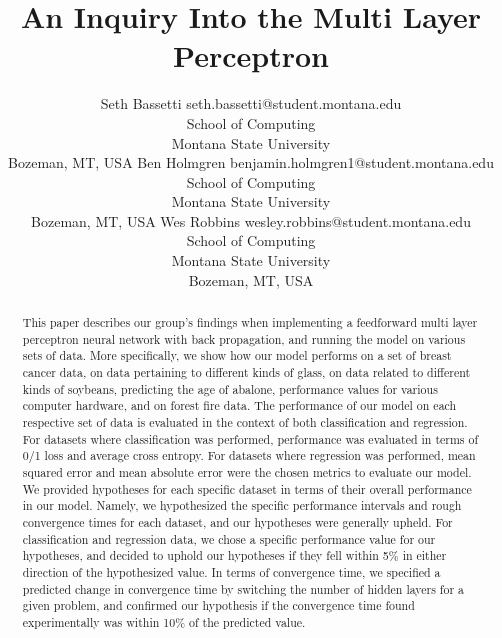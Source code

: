 \documentclass[twoside,11pt]{article}
\begin{document}
\title{An Inquiry Into the Multi Layer Perceptron}

\author{\name Seth Bassetti \email seth.bassetti@student.montana.edu \\
       \addr School of Computing\\
       Montana State University\\
       Bozeman, MT, USA
	\AND
	\name Ben Holmgren \email benjamin.holmgren1@student.montana.edu \\
       \addr School of Computing\\
       Montana State University\\
       Bozeman, MT, USA
       \AND
       \name Wes Robbins \email wesley.robbins@student.montana.edu \\
       \addr School of Computing\\
       Montana State University\\
       Bozeman, MT, USA}

\maketitle

\begin{abstract}%
This paper describes our group's findings when implementing a feedforward multi layer
perceptron neural network with back propagation, and running the model on various sets of data. 
 More specifically, we show how our model performs on a set of breast cancer data, on data pertaining
to different kinds of glass, on data related to different kinds of soybeans, predicting the age of abalone,
performance values for various computer hardware, and on forest fire data.
	The performance of our model on each respective set of data
 is evaluated in the context of both classification and regression. For datasets where
 classification was performed, performance was evaluated in terms of
 0/1 loss and average cross entropy. For datasets where regression was performed,
 mean squared error and mean absolute error were the chosen metrics to evaluate
 our model. We provided hypotheses for each specific dataset in terms of their overall performance in our model.
 Namely, we hypothesized the specific performance intervals and rough convergence times for each dataset, and our
 hypotheses were generally upheld. For classification and regression data, we chose a specific performance value for
our hypotheses, and decided to uphold our hypotheses if they fell within 5\% in either direction of the hypothesized
value. In terms of convergence time, we specified a predicted change in convergence time by switching the number
	of hidden layers for a given problem, and confirmed our hypothesis
if the convergence time found experimentally was within 10\% of the predicted value.
\end{abstract}
\end{document}
